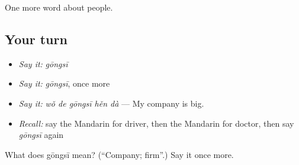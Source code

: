 \begin{grammarlens}[title={What you've built}]
One more word about people.
\end{grammarlens}

\subsection*{Your turn}
\begin{itemize}
\raggedright
  \item \emph{Say it:} \emph{gōngsī}
  \item \emph{Say it:} \emph{gōngsī}, once more
  \item \emph{Say it:} \emph{wǒ de gōngsī hěn dà} — My company is big.
  \item \emph{Recall:} say the Mandarin for driver, then the Mandarin for doctor, then say \emph{gōngsī} again
\end{itemize}

\begin{tcolorbox}[breakable,colback=teal!4,colframe=teal!35!black,title={Before you move on}]
What does gōngsī mean? (\textquotedblleft{}Company; firm\textquotedblright{}.) Say it once more.
\end{tcolorbox}
